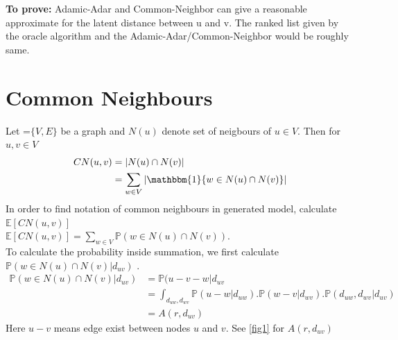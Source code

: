\documentclass{article}
\begin{document}
\textbf{To prove:} Adamic-Adar and Common-Neighbor can give a reasonable approximate for the latent distance between u and v. The ranked list given by the oracle algorithm and the Adamic-Adar/Common-Neighbor would be roughly same.
\section{Common Neighbours}
Let =$\{V,E\}$ be a graph and $N(u)$ denote set of neigbours of $u\in V$. Then for $u,v\in V$
\begin{equation} \label{eq1}
\begin{split}
CN(u,v) & = |N(u)\cap N(v)|\\
& =\sum_{w\in V} |\mathbbm{1}\{w\in N(u)\cap N(v)\}|
\end{split}
\end{equation}
In order to find notation of common neighbours in generated model, calculate $\mathbb{E}[CN(u,v)]$\\
$\mathbb{E}[CN(u,v)]=\sum_{w\in V}\mathbb{P}(w\in N(u)\cap N(v))$.\\ To calculate the probability inside summation, we first calculate $\mathbb{P}(w\in N(u)\cap N(v)|d_{uv})$ .
\begin{equation} \label{eq1}
\begin{split}
\mathbb{P}(w\in N(u)\cap N(v)|d_{uv}) &=\mathbb{P}(u-v-w|d_{uv}\\
&= \int_{d_{uw},d_{wv}}\mathbb{P}(u-w|d_{uw}).\mathbb{P}(w-v|d_{wv}).\mathbb{P}(d_{uw},d_{wv}|d_{uv})\\
&=A(r,d_{uv})
\end{split}
\end{equation}
Here $u-v$ means edge exist between nodes $u$ and $v$. See \ref{fig1} for $A(r,d_{uv})$\\
\end{document}
